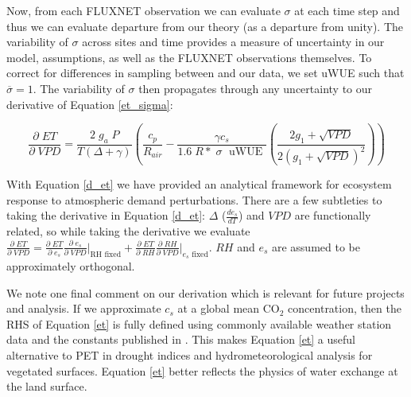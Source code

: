 \documentclass[draft,linenumbers]{agujournal}
\begin{document}
Now, from each FLUXNET observation we can evaluate $\sigma$ at each time step and thus we can evaluate departure from our theory (as a departure from unity). The variability of $\sigma$ across sites and time provides a measure of uncertainty in our model, assumptions, as well as the FLUXNET observations themselves. To correct for differences in sampling between \cite{Zhou_2015} and our data, we set uWUE such that $\overline{\sigma} = 1$. The variability of $\sigma$ then propagates through any uncertainty to our derivative of Equation \ref{et_sigma}:

\begin{linenomath*}
  \begin{equation}
    \frac{\partial \;  ET}{\partial \; VPD} = \frac{2\; g_a \; P}{T(\Delta + \gamma)}   \left(\frac{ c_p}{R_{air}} -  \frac{\gamma c_s }{1.6 \; R*\; \sigma \; \text{ uWUE }} \left( \frac{2 g_1 + \sqrt{VPD}}{2 (g_1 + \sqrt{VPD})^2}\right) \right)
    \label{d_et}
  \end{equation}
\end{linenomath*}

With Equation \ref{d_et} we have provided an analytical framework for ecosystem response to atmospheric demand perturbations. There are a few subtleties to taking the derivative in Equation \ref{d_et}: $\Delta$ ($\frac{d e_{s}}{d T}$) and $VPD$ are functionally related, so while taking the derivative we evaluate $\frac{\partial \; ET}{\partial \; VPD} = \frac{\partial \; ET} {\partial \; e_s} \frac{\partial \; e_s}{\partial \; VPD} \Big|_{\text{RH fixed}} + \frac{\partial \; ET}{\partial \; RH} \frac{\partial \; RH}{\partial \; VPD} \Big|_{\text{$e_s$ fixed}}$. $RH$ and $e_s$ are assumed to be approximately orthogonal. 

We note one final comment on our derivation which is relevant for future projects and analysis. If we approximate $c_s$ at a global mean CO$_2$ concentration, then the RHS of Equation \ref{et} is fully defined using commonly available weather station data and the constants published in \citet{Zhou_2015, Lin_2015}. This makes Equation \ref{et} a useful alternative to PET in drought indices and hydrometeorological analysis for vegetated surfaces. Equation \ref{et} better reflects the physics of water exchange at the land surface. 
\end{document}
